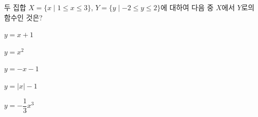 \hspace*{2mm}\begin{minipage}[t]{\dimexpr\linewidth-2mm\relax}\vspace{0pt}
두 집합 $X=\{x\mid 1\le x\le 3\}$, $Y=\{y\mid -2\le y\le 2\}$에 대하여 다음 중 $X$에서 $Y$로의 함수인 것은?
\begin{choices32}{\rule[-3ex]{0pt}{8ex}$y=x+1$}{\rule[-3ex]{0pt}{8ex}$y=x^2$}{\rule[-3ex]{0pt}{8ex}$y=-x-1$}{\rule[-3ex]{0pt}{8ex}$y=|x|-1$}{\rule[-3ex]{0pt}{8ex}$y=-\dfrac{1}{3}x^3$}\end{choices32}\end{minipage}
